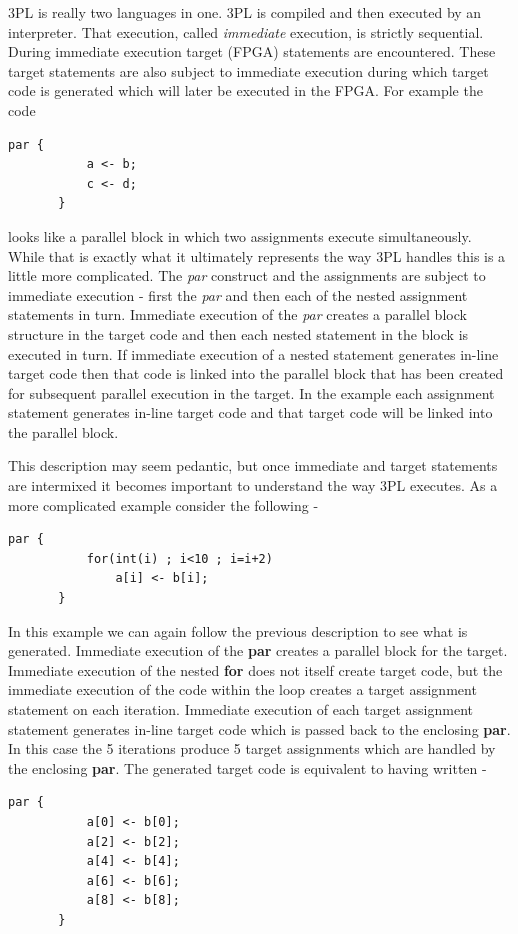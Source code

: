     3PL is really two languages in one. 3PL is compiled and then executed
    by an interpreter. That execution, called {\em immediate} execution,
    is strictly sequential. During immediate execution target (FPGA)
    statements are encountered. These target statements are also subject
    to immediate execution during which target code is generated which
    will later be executed in the FPGA. For example the code
    \begin{lstlisting}[gobble=4, language=threepl]
       par {
           a <- b;
           c <- d;
       }
    \end{lstlisting}
    looks like a parallel block in which two assignments execute
    simultaneously. While that is exactly what it ultimately represents the
    way 3PL handles this is a little more complicated. The {\em par}
    construct and the assignments are subject to immediate execution -
    first the {\em par} and then each of the nested assignment statements
    in turn. Immediate execution of the {\em par} creates a parallel block
    structure in the target code and then each nested statement in the
    block is executed in turn. If immediate execution of a nested statement
    generates in-line target code then that code is linked into the
    parallel block that has been created for subsequent parallel execution
    in the target. In the example each assignment statement generates
    in-line target code and that target code will be linked into the
    parallel block.

    This description may seem pedantic, but once immediate and target
    statements are intermixed it becomes important to understand the way
    3PL executes. As a more complicated example consider the following -
    \pagebreak
    \begin{lstlisting}[gobble=4, language=threepl]
       par {
           for(int(i) ; i<10 ; i=i+2)
               a[i] <- b[i];
       }
    \end{lstlisting}
    In this example we can again follow the previous description to see
    what is generated. Immediate execution of the {\bf par} creates a
    parallel block for the target. Immediate execution of the nested {\bf
    for} does not itself create target code, but the immediate
    execution of the code within the loop creates a target assignment
    statement on each iteration. Immediate execution of each target
    assignment statement generates in-line target code which is passed
    back to the enclosing {\bf par}. In this case the 5 iterations produce
    5 target assignments which are handled by the enclosing {\bf par}. The
    generated target code is equivalent to having written -
    \begin{lstlisting}[gobble=4, language=threepl]
       par {
           a[0] <- b[0];
           a[2] <- b[2];
           a[4] <- b[4];
           a[6] <- b[6];
           a[8] <- b[8];
       }
    \end{lstlisting}
    
